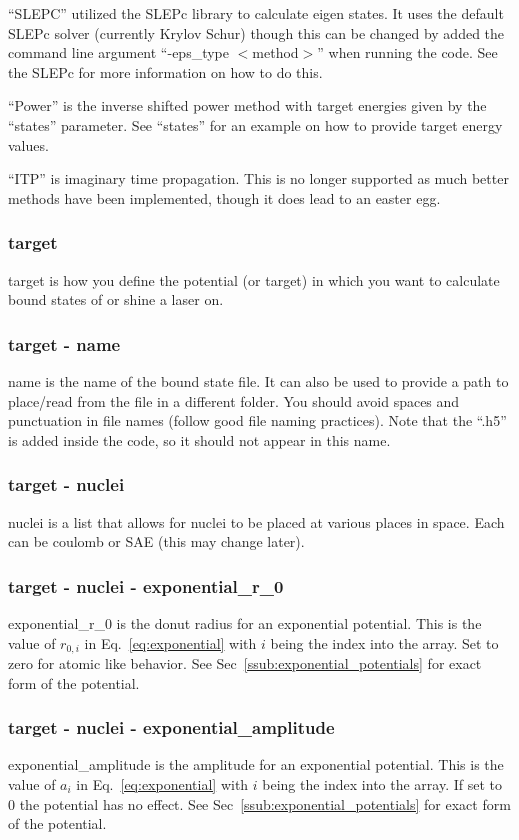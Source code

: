 \documentclass{article}
\begin{document}
``SLEPC'' utilized the SLEPc library to calculate eigen states. It uses the default SLEPc solver (currently Krylov Schur) though this can be changed by added the command line argument ``-eps\_type $<$method$>$'' when running the code. See the SLEPc for more information on how to do this.

``Power'' is the inverse shifted power method with target energies given by the ``states'' parameter. See ``states'' for an example on how to provide target energy values.

``ITP'' is imaginary time propagation. This is no longer supported as much better methods have been implemented, though it does lead to an easter egg.

\subsubsection{target}
target is how you define the potential (or target) in which you want to calculate bound states of or shine a laser on.

\subsubsection{target - name}
\label{ssub:target_name}
name is the name of the bound state file. It can also be used to provide a path to place/read from the file in a different folder. You should avoid spaces and punctuation in file names (follow good file naming practices). Note that the ``.h5'' is added inside the code, so it should not appear in this name.

\subsubsection{target - nuclei}
nuclei is a list that allows for nuclei to be placed at various places in space. Each can be coulomb or SAE (this may change later).

\subsubsection{target - nuclei - exponential\_r\_0}
exponential\_r\_0 is the donut radius for an exponential potential. This is the value of $r_{0,i}$ in Eq.~\ref{eq:exponential} with $i$ being the index into the array. Set to zero for atomic like behavior. See Sec~\ref{ssub:exponential_potentials} for exact form of the potential.

\subsubsection{target - nuclei - exponential\_amplitude}
exponential\_amplitude is the amplitude for an exponential potential. This is the value of $a_i$ in Eq.~\ref{eq:exponential} with $i$ being the index into the array. If set to 0 the potential has no effect. See Sec~\ref{ssub:exponential_potentials} for exact form of the potential.
\end{document}

